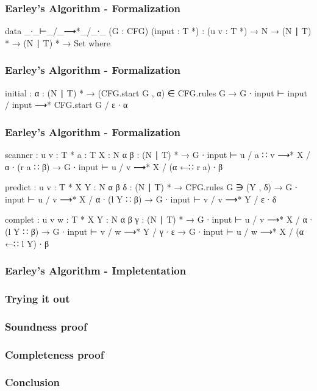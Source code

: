 \begin{frame}
	\frametitle{Earley's Algorithm - Formalization}
	\begin{code}
	data _∙_⊢_/_⟶*_/_∙_ (G : CFG) (input : T *) :
	  (u v : T *) → N → (N ∣ T) * → (N ∣ T) * → Set where
	\end{code}
\end{frame}

\begin{frame}
	\frametitle{Earley's Algorithm - Formalization}
	\begin{code}
	  initial : {α : (N ∣ T) *} →
	    (CFG.start G , α) ∈ CFG.rules G →
	    G ∙ input ⊢ input / input ⟶* CFG.start G / ε ∙ α
	\end{code}
\end{frame}

\begin{frame}
	\frametitle{Earley's Algorithm - Formalization}
	\begin{code}
	  scanner : {u v : T *} {a : T} {X : N} {α β : (N ∣ T) *} →
	    G ∙ input ⊢ u / a ∷ v ⟶* X / α ∙ (r a ∷ β) →
	    G ∙ input ⊢ u / v ⟶* X / (α ←∷ r a) ∙ β

	  predict : {u v : T *} {X Y : N} {α β δ : (N ∣ T) *} →
	    CFG.rules G ∋ (Y , δ) →
	    G ∙ input ⊢ u / v ⟶* X / α ∙ (l Y ∷ β) →
	    G ∙ input ⊢ v / v ⟶* Y / ε ∙ δ

	  complet : {u v w : T *} {X Y : N} {α β γ : (N ∣ T) *} →
	    G ∙ input ⊢ u / v ⟶* X / α ∙ (l Y ∷ β) →
	    G ∙ input ⊢ v / w ⟶* Y / γ ∙ ε →
	    G ∙ input ⊢ u / w ⟶* X / (α ←∷ l Y) ∙ β
	\end{code}
\end{frame}

\begin{frame}
	\frametitle{Earley's Algorithm - Impletentation}
\end{frame}

\begin{frame}
	\frametitle{Trying it out}
\end{frame}

\begin{frame}
	\frametitle{Soundness proof}
\end{frame}

\begin{frame}
	\frametitle{Completeness proof}
\end{frame}

\begin{frame}
	\frametitle{Conclusion}
\end{frame}
